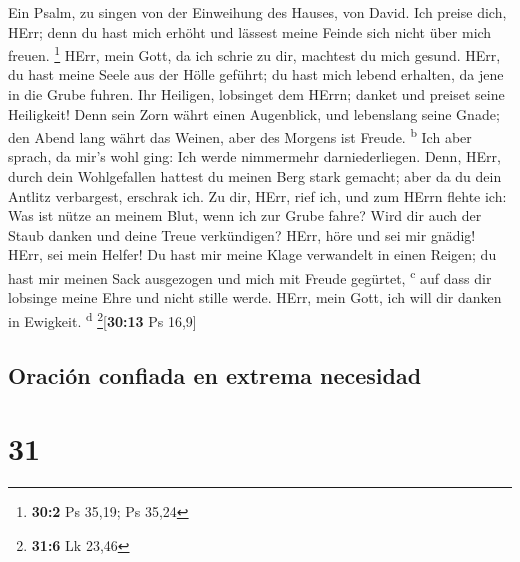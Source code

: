  Ein Psalm, zu singen von der Einweihung des Hauses, von
David.  Ich preise dich, HErr; denn du hast mich erhöht
und lässest meine Feinde sich nicht über mich freuen. \footnote{\textbf{30:2}
  Ps 35,19; Ps 35,24}  HErr, mein Gott, da ich schrie zu
dir, machtest du mich gesund.  HErr, du hast meine Seele
aus der Hölle geführt; du hast mich lebend erhalten, da jene in die
Grube fuhren.  Ihr Heiligen, lobsinget dem HErrn; danket
und preiset seine Heiligkeit!  Denn sein Zorn währt einen
Augenblick, und lebenslang seine Gnade; den Abend lang währt das Weinen,
aber des Morgens ist Freude. \textsuperscript{b}  Ich aber
sprach, da mir's wohl ging: Ich werde nimmermehr darniederliegen.
 Denn, HErr, durch dein Wohlgefallen hattest du meinen
Berg stark gemacht; aber da du dein Antlitz verbargest, erschrak ich.
 Zu dir, HErr, rief ich, und zum HErrn flehte ich:
 Was ist nütze an meinem Blut, wenn ich zur Grube fahre?
Wird dir auch der Staub danken und deine Treue verkündigen?
 HErr, höre und sei mir gnädig! HErr, sei mein Helfer!
 Du hast mir meine Klage verwandelt in einen Reigen; du
hast mir meinen Sack ausgezogen und mich mit Freude gegürtet,
\textsuperscript{c}  auf dass dir lobsinge meine Ehre und
nicht stille werde. HErr, mein Gott, ich will dir danken in Ewigkeit.
\textsuperscript{d} \footnote{\textbf{31:6} Lk 23,46}{[}\textbf{30:13}
Ps 16,9{]}

\hypertarget{oraciuxf3n-confiada-en-extrema-necesidad}{%
\subsection{Oración confiada en extrema
necesidad}\label{oraciuxf3n-confiada-en-extrema-necesidad}}

\hypertarget{section-30}{%
\section{31}\label{section-30}}

